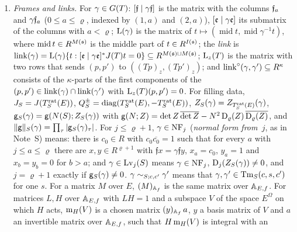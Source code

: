 \documentclass[11pt,a4paper]{article}
\theoremstyle{plainx}
\theoremstyle{uprightx}
\newcommand{\cj}[1]{\overline{#1}}
\newcommand{\Mid}{\operatorname{mid}}
\newcommand{\sA}{\mathsf{A}}
\begin{document}
\begin{enumerate}[label=(R\arabic*),leftmargin=3.1em,itemsep=3pt]
$\FixN{s}{x}$ means: there is a finite set $\sA$ of pairs $(w,\epsilon)$ such that $x$ is at most the product of
the norms of the places $w$ over $(w,\epsilon)\in\sA$, and for each of them some $v\ne0$ with
$s\in\vfix{S}{w}{(\epsilon,v)}$. An element $s\in\GRes{S}$ \emph{agrees}, $\Agr{S}{s}$, if
$\uchar{S}{u}=\uchar{S}{u'}$ for all $u,u'\in\KS{S}\cap\UT{\Tlat{S}{\AEf}}$ with $\redS{S}(u)\,s=s\,\redS{S}(u')$.
A set $\Xi\subseteq\GS{S}{E}$ is \emph{stable}, $\IsStab{S}{\Xi}$, if $u^{-1}\gamma u'\in\Xi\Leftrightarrow\gamma\in\Xi$
for all $u,u'\in\UT{\Trat{S}{E}}$ and all $\gamma$.
\item\label{r:links} \emph{Frames and links.} For $\gamma\in\GT{T}$: $\fpair{\gamma}$ is the matrix with the
columns $\fr{a}$ and $\gamma\fr{a}$ ($0\le a\le\varrho$, indexed by $(1,a)$ and $(2,a)$), $\ifpair{\gamma}$ its
submatrix of the columns with $a<\varrho$; $\lmat{\gamma}$ is the matrix of $t\mapsto(\Mid t,\Mid\gamma^{-1}t)$,
where $\Mid t\in R^{\Mx{\fs}}$ is the middle part of $t\in R^{\Ix{\fs}}$; the \emph{link} is
$\link{\gamma}=\lmat{\gamma}\{t:\ifpair{\gamma}^{*}\JT{T}t=0\}\subseteq R^{\Mx{\fs}\sqcup\Mx{\fs}}$; $\zfp{T}$ is the
matrix with two rows that sends $(p,p')$ to $((Tp)_z,(Tp')_z)$; and $\clink{\gamma}{\gamma'}\subseteq R^{\kappa}$
consists of the $\kappa$-parts of the first components of the $(p,p')\in\link{\gamma}\cap\link{\gamma'}$ with
$\zfp{T}(p,p')=0$. For filling data, $\ratG{S}=\JT{\Trat{S}{E}}$,
$\lform{S}=\operatorname{diag}(\Trat{S}{E},-\Trat{S}{E})$, $\Zf{S}{\gamma}=\ZT{\Trat{S}{E}}{\gamma}$,
$\tdisc{S}{\gamma}=\fdisc{\NS{S}}{\Zf{S}{\gamma}}$ with
$\fdisc{N}{Z}=\det Z\,\cj{\det Z}-N^2\,\lmin{\varrho}{Z}\,\cj{\lmin{\varrho}{Z}}$, and
$\tdnorm{S}{\gamma}=\prod_\tau|\tdisc{S}{\gamma}_\tau|$. For $j\le\varrho+1$, $\IsNF{j}{\gamma}$ (\emph{normal form
from~$j$}, as in Note~S) means: there is $c_0\in R$ with $c_0\cj{c_0}=1$ such that for every $a$ with $j\le a\le\varrho$ there
are $x,y\in R^{\varrho+1}$ with $\mathfrak f x=\gamma\mathfrak f y$, $x_a=c_0$, $y_a=1$ and $x_b=y_b=0$ for $b>a$; and
$\HasLev{S}{j}{\gamma}$ means $\IsNF{j}{\gamma}$, $\lmin{j}{\Zf{S}{\gamma}}\ne0$, and $j=\varrho+1$ exactly if
$\tdisc{S}{\gamma}\ne0$. $\Cong{S}{c}{c'}{\gamma}{\gamma'}$ means that $\gamma,\gamma'\in\terms{S}{c}{s}{c'}$ for one
$s$. For a matrix $M$ over $E$, $\fadm{M}$ is the same matrix over $\AEf$. For matrices $L,H$ over $\AEf$ with
$LH=1$ and a subspace $V$ of the space $E^{\Omega}$ on which $H$ acts, $\slb{H}{V}$ is a chosen matrix $\fadm{y}\,a$,
$y$ a basis matrix of $V$ and $a$ an invertible matrix over $\AEf$, such that $H\,\slb{H}{V}$ is integral with an

\end{enumerate}
\end{document}
